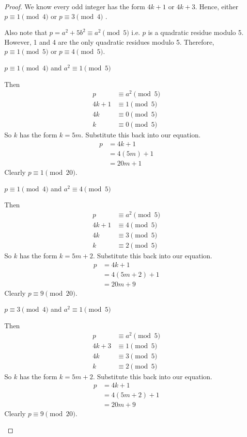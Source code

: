 \begin{proof}
We know every odd integer has the form $4k+1$ or $4k+3$. Hence, either
$p \equiv 1 \pmod 4$ or $p \equiv 3 \pmod 4$ .

Also note that $p = a^2 + 5b^2 \equiv a^2 \pmod 5$ i.e. $p$ is a quadratic
residue modulo 5. However, 1 and 4 are the only quadratic residues modulo 5.
Therefore, $p \equiv 1 \pmod 5$ or $p \equiv 4 \pmod 5$.

\begin{case}
$p \equiv 1 \pmod 4$ and $a^2 \equiv 1 \pmod 5$

Then
\begin{align*}
		  p &\equiv a^2 \pmod 5 \\
	 4k + 1 &\equiv 1 \pmod 5 \\
	     4k &\equiv 0 \pmod 5 \\
	      k &\equiv 0 \pmod 5
\end{align*}
So $k$ has the form $k=5m$. Substitute this back into our equation.
\begin{align*}
	p &= 4k + 1 \\
	  &= 4(5m) + 1 \\
	  &= 20m + 1
\end{align*}
Clearly $p \equiv 1 \pmod{20}$.
\end{case}

\begin{case}
$p \equiv 1 \pmod 4$ and $a^2 \equiv 4 \pmod 5$

Then
\begin{align*}
		  p &\equiv a^2 \pmod 5 \\
	 4k + 1 &\equiv 4 \pmod 5 \\
	     4k &\equiv 3 \pmod 5 \\
	      k &\equiv 2 \pmod 5
\end{align*}
So $k$ has the form $k=5m+2$. Substitute this back into our equation.
\begin{align*}
	p &= 4k + 1 \\
	  &= 4(5m+2) + 1 \\
	  &= 20m + 9
\end{align*}
Clearly $p \equiv 9 \pmod{20}$.
\end{case}

\begin{case}
$p \equiv 3 \pmod 4$ and $a^2 \equiv 1 \pmod 5$

Then
\begin{align*}
		  p &\equiv a^2 \pmod 5 \\
	 4k + 3 &\equiv 1 \pmod 5 \\
	     4k &\equiv 3 \pmod 5 \\
	      k &\equiv 2 \pmod 5
\end{align*}
So $k$ has the form $k=5m+2$. Substitute this back into our equation.
\begin{align*}
	p &= 4k + 1 \\
	  &= 4(5m+2) + 1 \\
	  &= 20m + 9
\end{align*}
Clearly $p \equiv 9 \pmod{20}$.
\end{case}


\end{proof}
